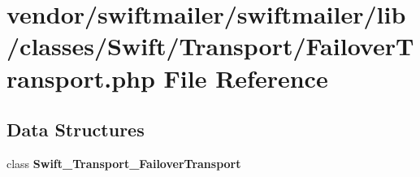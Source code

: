 \section{vendor/swiftmailer/swiftmailer/lib/classes/\+Swift/\+Transport/\+Failover\+Transport.php File Reference}
\label{_transport_2_failover_transport_8php}
\subsection*{Data Structures}
\begin{DoxyCompactItemize}
\item 
class {\bf Swift\+\_\+\+Transport\+\_\+\+Failover\+Transport}
\end{DoxyCompactItemize}
